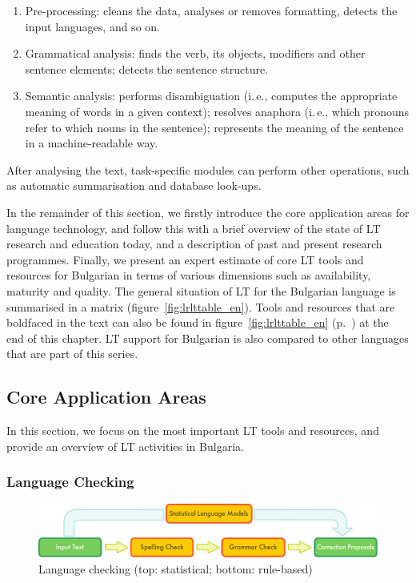 \documentclass[]{../../metanetpaper}
\begin{document}
\begin{multicols}{2}
\begin{enumerate}
\item Pre-processing: cleans the data, analyses or removes formatting, detects the input languages, and so on.
\item Grammatical analysis: finds the verb, its objects, modifiers and other sentence elements; detects the sentence structure.
\item Semantic analysis: performs disambiguation (i.\,e., computes the appropriate meaning of words in a given context); resolves anaphora (i.\,e., which pronouns refer to which nouns in the sentence); represents the meaning of the sentence in a machine-readable way.
\end{enumerate}

After analysing the text, task-specific modules can perform other operations, such as automatic summarisation and database look-ups.

In the remainder of this section, we firstly introduce the core application areas for language technology, and follow this with a brief overview of the state of LT research and education today, and a description of past and present research programmes. Finally, we present an expert estimate of core LT tools and resources for Bulgarian in terms of various dimensions such as availability, maturity and quality. The general situation of LT for the Bulgarian language is summarised in a matrix (figure~\ref{fig:lrlttable_en}). Tools and resources that are boldfaced in the text can also be found in figure~\ref{fig:lrlttable_en} (p.~\pageref{fig:lrlttable_en}) at the end of this chapter. LT support for Bulgarian is also compared to other languages that are part of this series.

\subsection{Core Application Areas}

In this section, we focus on the most important LT tools and resources, and provide an overview of LT activities in Bulgaria. 

\subsubsection{Language Checking}

\begin{figure}[t]
  \center
  \includegraphics[width=\textwidth]{../_media/english/language_checking}
  \caption{Language checking (top: statistical; bottom: rule-based)}
  \label{fig:langcheckingaarch_en}
\end{figure}


\end{multicols}
\end{document}
